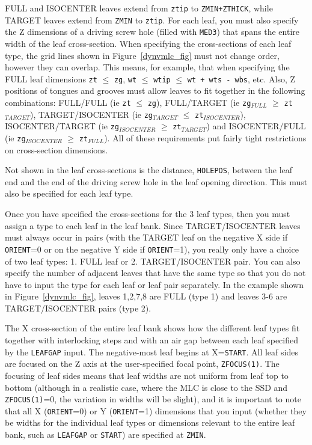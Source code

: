 \documentclass[12pt,twoside]{article}
\begin{document}
FULL and ISOCENTER leaves extend from {\tt ztip} to {\tt ZMIN+ZTHICK}, while
TARGET leaves extend from {\tt ZMIN} to {\tt ztip}.  For each leaf, you
must also specify
the Z dimensions of a driving screw hole (filled with {\tt MED3}) that
spans the entire width of the leaf cross-section.  When specifying the
cross-sections of each leaf type, the grid lines shown in
Figure~\ref{dynvmlc_fig} must not change order, however they can overlap.
This means, for example, that when specifying the FULL leaf dimensions
{\tt zt} $\leq$ {\tt zg}, {\tt wt} $\leq$ {\tt wtip} $\leq$ {\tt wt + wts - wbs}, etc.  Also, Z positions of tongues and grooves must allow leaves to fit
together in the following
combinations: FULL/FULL (ie {\tt zt} $\leq$ {\tt zg}), FULL/TARGET
(ie {\tt zg}$_{FULL}$ $\geq$ {\tt zt}$_{TARGET}$), TARGET/ISOCENTER
(ie {\tt zg}$_{TARGET}$ $\leq$ {\tt zt}$_{ISOCENTER}$), ISOCENTER/TARGET
(ie {\tt zg}$_{ISOCENTER}$ $\geq$ {\tt zt}$_{TARGET}$)
and ISOCENTER/FULL (ie {\tt zg}$_{ISOCENTER}$ $\geq$ {\tt zt}$_{FULL}$).
All of these requirements put fairly tight restrictions on cross-section
dimensions.

Not shown in the leaf cross-sections is the distance, {\tt HOLEPOS},
between the leaf end and the end of the driving screw hole in the
leaf opening direction.  This must also be specified for each leaf type.

Once you have specified the cross-sections for the 3 leaf types, then you
must assign a type to each leaf in the leaf bank.  Since TARGET/ISOCENTER
leaves must always occur in pairs (with the TARGET leaf on the
negative X side if {\tt ORIENT}=0 or on the negative Y side if
{\tt ORIENT}=1), you really only have a choice of
two leaf types: 1. FULL leaf or 2. TARGET/ISOCENTER pair.  You can also specify
the number of adjacent leaves that have the same type so that you do not have
to input the type for each leaf or leaf pair separately.  In the example shown
in Figure~\ref{dynvmlc_fig}, leaves 1,2,7,8 are FULL (type 1) and
leaves 3-6 are TARGET/ISOCENTER pairs (type 2).

The X cross-section of the entire leaf bank shows how the different leaf types
fit together with interlocking steps and with an air gap between each leaf
specified by the {\tt LEAFGAP} input.  The negative-most leaf begins at
X={\tt START}.  All leaf sides are focused on
the Z axis at the user-specified focal point, {\tt ZFOCUS(1)}.  The focusing
of leaf sides means that leaf widths are not uniform from leaf top to bottom
(although in a realistic case, where the MLC is close to the SSD and
{\tt ZFOCUS(1)}=0, the variation in widths will be slight), and it is important
to note that all X ({\tt ORIENT}=0) or Y ({\tt ORIENT}=1) dimensions
 that you input (whether they be widths for the individual leaf types
or dimensions relevant to the entire leaf bank,
such as {\tt LEAFGAP} or {\tt START}) are specified at {\tt ZMIN}.
\end{document}
